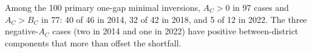 \documentclass[11pt]{article}
\begin{document}
Among the 100 primary one-gap minimal inversions, \(A_C>0\) in 97 cases and
\(A_C>B_C\) in 77: 40 of 46 in 2014, 32 of 42 in 2018, and 5 of 12 in 2022.
The three negative-\(A_C\) cases (two in 2014 and one in 2022) have positive
between-district components that more than offset the shortfall.

\end{document}
